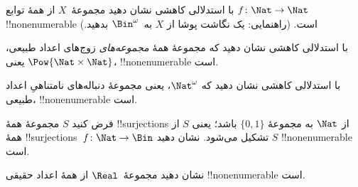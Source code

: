 \documentclass[../../../include/open-logic-section]{subfiles}
\begin{document}
\begin{prob}\label{sfr:siz:red-alt:prob:nat-nat}
  با استدلالی کاهشی نشان دهید مجموعهٔ~$X$ از همهٔ توابع
  $f\colon \Nat \to \Nat$ !!{nonenumerable} است. (راهنمایی: یک نگاشت
  پوشا از $X$ به~$\Bin^\omega$ بدهید.)
\end{prob}

\begin{prob}
با استدلالی کاهشی نشان دهید که مجموعهٔ همهٔ \emph{مجموعه‌های} زوج‌های
اعداد طبیعی، یعنی $\Pow{\Nat \times \Nat}$، !!{nonenumerable} است.
\end{prob}

\begin{prob}
با استدلالی کاهشی نشان دهید که $\Nat^\omega$، یعنی مجموعهٔ دنباله‌های
نامتناهیِ اعداد طبیعی، !!{nonenumerable} است.
\end{prob}


\begin{prob}
فرض کنید $S$ مجموعهٔ همهٔ !!{surjection}s از $\Nat$ به مجموعهٔ
$\{0,1\}$ باشد؛ یعنی $S$ از همهٔ !!{surjection}s~$f \colon \Nat
\to \Bin$ تشکیل می‌شود. نشان دهید $S$ !!{nonenumerable} است.
\end{prob}

\begin{prob}
نشان دهید مجموعهٔ~$\Real$ از همهٔ اعداد حقیقی !!{nonenumerable} است.
\end{prob}
\end{document}
